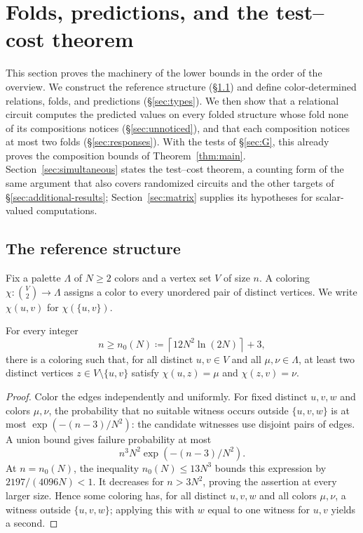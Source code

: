 \section{Folds, predictions, and the test--cost theorem}\label{sec:preservation}
This section proves the machinery of the lower bounds in the order of the
overview. We construct the reference structure (\S\ref{sec:structure}) and
define color-determined relations, folds, and predictions
(\S\ref{sec:types}). We then show
that a relational circuit computes the predicted values on every folded
structure whose fold none of its compositions notices (\S\ref{sec:unnoticed}),
and that each composition notices at most two folds
(\S\ref{sec:responses}). With the tests of \S\ref{sec:G}, this already
proves the composition bounds of Theorem~\ref{thm:main}.
Section~\ref{sec:simultaneous} states the test--cost theorem, a counting
form of the same argument that also covers randomized circuits and the
other targets of \S\ref{sec:additional-results};
Section~\ref{sec:matrix} supplies its hypotheses for scalar-valued
computations.

\subsection{The reference structure}\label{sec:structure}
Fix a palette $\Lambda$ of $N\ge2$ colors and a vertex set $V$ of size $n$.
A coloring $\chi:\binom V2\to\Lambda$ assigns a color to every unordered
pair of distinct vertices. We write $\chi(u,v)$ for $\chi(\{u,v\})$.

\begin{lemma}\label{lem:palette}
For every integer
\[
 n\ge n_0(N)\coloneqq\left\lceil12N^2\ln(2N)\right\rceil+3,
\]
there is a coloring such that, for all distinct $u,v\in V$ and all
$\mu,\nu\in\Lambda$, at least two distinct vertices
$z\in V\setminus\{u,v\}$ satisfy
$\chi(u,z)=\mu$ and $\chi(z,v)=\nu$.
\end{lemma}
\begin{proof}
Color the edges independently and uniformly. For fixed distinct $u,v,w$
and colors $\mu,\nu$, the probability that no suitable witness occurs
outside $\{u,v,w\}$ is at most $\exp(-(n-3)/N^2)$: the candidate witnesses
use disjoint pairs of edges. A union bound gives failure probability at most
\[
 n^3N^2\exp(-(n-3)/N^2).
\]
At $n=n_0(N)$, the inequality $n_0(N)\le13N^3$ bounds this expression by
$2197/(4096N)<1$. It decreases for $n>3N^2$, proving the assertion at every
larger size. Hence some coloring has, for all distinct $u,v,w$ and all
colors $\mu,\nu$, a witness outside $\{u,v,w\}$; applying this with $w$
equal to one witness for $u,v$ yields a second.
\end{proof}

